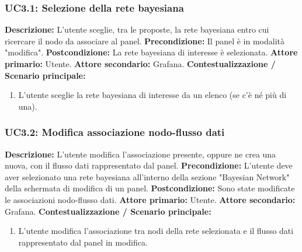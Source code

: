                 \subsubsection{UC3.1: Selezione della rete bayesiana}
                    \textbf{Descrizione:} L’utente sceglie, tra le proposte, la rete bayesiana entro cui ricercare il nodo da associare al panel.
                    \newline
                    \textbf{Precondizione:} Il panel è in modalità "modifica".
                    \newline
                    \textbf{Postcondizione:} La rete bayesiana di interesse è selezionata.
                    \newline
                    \textbf{Attore primario:} Utente.
                    \newline
                    \textbf{Attore secondario:} Grafana.
                    \newline
                    \textbf{Contestualizzazione / Scenario principale:} \begin{enumerate}
                        \item L’utente sceglie la rete bayesiana di interesse da un elenco (se c'è né più di una).
                    \end{enumerate}
                    
               
                
                \subsubsection{UC3.2: Modifica associazione nodo-flusso dati}
                    \textbf{Descrizione:} L’utente modifica l'associazione presente, oppure ne crea una nuova, con il flusso dati rappresentato dal panel.
                    \newline
                    \textbf{Precondizione:} L'utente deve aver selezionato una rete bayesiana all'interno della sezione "Bayesian Network" della schermata di modifica di un panel.
                    \newline
                    \textbf{Postcondizione:} Sono state modificate le associazioni nodo-flusso dati.
                    \newline
                    \textbf{Attore primario:} Utente.
                    \newline
                    \textbf{Attore secondario:} Grafana.
                    \newline
                    \textbf{Contestualizzazione / Scenario principale:} \begin{enumerate}
                        \item L’utente modifica l'associazione tra nodi della rete selezionata e il flusso dati rappresentato dal panel in modifica.
                    \end{enumerate}
                    
